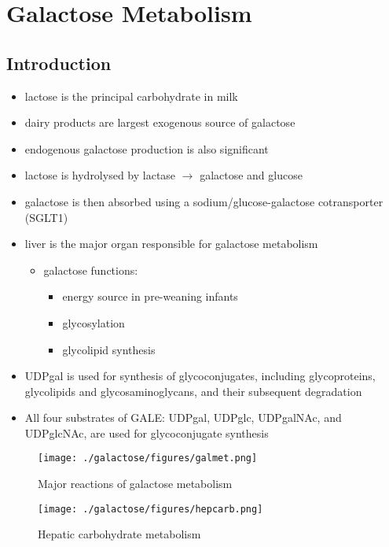 \documentclass{scrartcl}
\begin{document}
\section{Galactose Metabolism}
\label{sec:org8b7ae39}
\subsection{Introduction}
\label{sec:org6298515}

\begin{itemize}
\item lactose is the principal carbohydrate in milk
\item dairy products are largest exogenous source of galactose
\item endogenous galactose production is also significant
\item lactose is hydrolysed by lactase \(\to\) galactose and glucose
\item galactose is then absorbed using a sodium/glucose-galactose cotransporter (SGLT1)
\item liver is the major organ responsible for galactose metabolism
\begin{itemize}
\item galactose functions:
\begin{itemize}
\item energy source in pre-weaning infants
\item glycosylation
\item glycolipid synthesis
\end{itemize}
\end{itemize}

\item UDPgal is used for synthesis of glycoconjugates, including
glycoproteins, glycolipids and glycosaminoglycans, and their
subsequent degradation
\item All four substrates of GALE: UDPgal, UDPglc, UDPgalNAc, and
UDPglcNAc, are used for glycoconjugate synthesis
\end{itemize}


\begin{figure}[htbp]
\centering
\texttt{[image: ./galactose/figures/galmet.png]}
\caption{\label{fig:org560849d}
Major reactions of galactose metabolism}
\end{figure}


\begin{figure}[htbp]
\centering
\texttt{[image: ./galactose/figures/hepcarb.png]}
\caption{\label{fig:org730d549}
Hepatic carbohydrate metabolism}
\end{figure}
\end{document}
